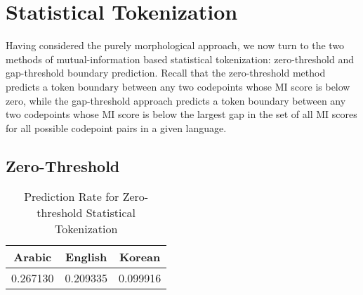 \FloatBarrier
\section{Statistical Tokenization}

Having considered the purely morphological approach, we now turn to the two methods of mutual-information based statistical tokenization: zero-threshold and gap-threshold boundary prediction. Recall that the zero-threshold method predicts a token boundary between any two codepoints whose MI score is below zero, while the gap-threshold approach predicts a token boundary between any two codepoints whose MI score is below the largest gap in the set of all MI scores for all possible codepoint pairs in a given language.

\subsection{Zero-Threshold}
\FloatBarrier

\begin{table}
	\centering
	\begin{tabular}{| c | c | c |}
		\hline
		Arabic & English & Korean \\ \hline
		0.267130 & 0.209335 & 0.099916 \\ \hline
	\end{tabular}
	\caption{Prediction Rate for Zero-threshold Statistical Tokenization}
	\label{zpredtable}
\end{table}

